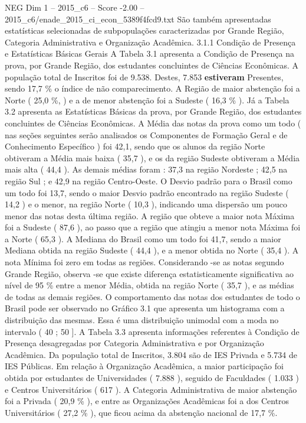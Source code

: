 \begin{textsample}{NEG Dim 1 – 2015\_c6 – Score -2.00 – 2015\_c6/enade\_2015\_ci\_econ\_5389f4fcd9.txt}
São também apresentadas estatísticas selecionadas de subpopulações caracterizadas por Grande Região, Categoria Administrativa e Organização Acadêmica. 3.1.1 Condição de Presença e Estatísticas Básicas Gerais A Tabela 3.1 apresenta a Condição de Presença na prova, por Grande Região, dos estudantes concluintes de Ciências Econômicas.
A população total de Inscritos foi de 9.538.
Destes, 7.853 \textbf{estiveram} Presentes, sendo 17,7 \% o índice de não comparecimento.
A Região de maior abstenção foi a Norte ( 25,0 \%, ) e a de menor abstenção foi a Sudeste ( 16,3 \% ).
Já a Tabela 3.2 apresenta as Estatísticas Básicas da prova, por Grande Região, dos estudantes concluintes de Ciências Econômicas.
A Média das notas da prova como um todo ( nas seções seguintes serão analisados os Componentes de Formação Geral e de Conhecimento Específico ) foi 42,1, sendo que os alunos da região Norte obtiveram a Média mais baixa ( 35,7 ), e os da região Sudeste obtiveram a Média mais alta ( 44,4 ).
As demais médias foram : 37,3 na região Nordeste ; 42,5 na região Sul ; e 42,9 na região Centro-Oeste.
O Desvio padrão para o Brasil como um todo foi 13,7, sendo o maior Desvio padrão encontrado na região Sudeste ( 14,2 ) e o menor, na região Norte ( 10,3 ), indicando uma dispersão um pouco menor das notas desta última região.
A região que obteve a maior nota Máxima foi a Sudeste ( 87,6 ), ao passo que a região que atingiu a menor nota Máxima foi a Norte ( 65,3 ).
A Mediana do Brasil como um todo foi 41,7, sendo a maior Mediana obtida na região Sudeste ( 44,4 ), e a menor obtida no Norte ( 35,4 ).
A nota Mínima foi zero em todas as regiões.
Considerando -se as notas segundo Grande Região, observa -se que existe diferença estatisticamente significativa ao nível de 95 \% entre a menor Média, obtida na região Norte ( 35,7 ), e as médias de todas as demais regiões.
O comportamento das notas dos estudantes de todo o Brasil pode ser observado no Gráfico 3.1 que apresenta um histograma com a distribuição das mesmas.
Essa é uma distribuição unimodal com a moda no intervalo ( 40 ; 50 ].
A Tabela 3.3 apresenta informações referentes à Condição de Presença desagregadas por Categoria Administrativa e por Organização Acadêmica.
Da população total de Inscritos, 3.804 são de IES Privada e 5.734 de IES Públicas.
Em relação à Organização Acadêmica, a maior participação foi obtida por estudantes de Universidades ( 7.888 ), seguido de Faculdades ( 1.033 ) e Centros Universitários ( 617 ).
A Categoria Administrativa de maior abstenção foi a Privada ( 20,9 \% ), e entre as Organizações Acadêmicas foi a dos Centros Universitários ( 27,2 \% ), que ficou acima da abstenção nacional de 17,7 \%.

\end{textsample}
